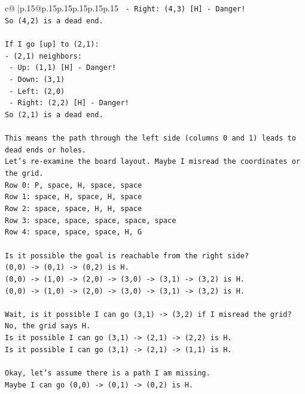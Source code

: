 \documentclass{article}
\begin{document}
{\begin{supertabular}{c@{$\;$}|p{.15\linewidth}@{}p{.15\linewidth}p{.15\linewidth}p{.15\linewidth}p{.15\linewidth}p{.15\linewidth}}
{{{\texttt{  {-} Right: (4,3) {[}H{]} {-} Danger!} \\
\texttt{So (4,2) is a dead end.} \\
\\ 
\texttt{If I go {[}up{]} to (2,1):} \\
\texttt{{-} (2,1) neighbors:} \\
\texttt{  {-} Up: (1,1) {[}H{]} {-} Danger!} \\
\texttt{  {-} Down: (3,1)} \\
\texttt{  {-} Left: (2,0)} \\
\texttt{  {-} Right: (2,2) {[}H{]} {-} Danger!} \\
\texttt{So (2,1) is a dead end.} \\
\\ 
\texttt{This means the path through the left side (columns 0 and 1) leads to dead ends or holes.} \\
\texttt{Let's re{-}examine the board layout. Maybe I misread the coordinates or the grid.} \\
\texttt{Row 0: P, space, H, space, space} \\
\texttt{Row 1: space, H, space, H, space} \\
\texttt{Row 2: space, space, H, H, space} \\
\texttt{Row 3: space, space, space, space, space} \\
\texttt{Row 4: space, space, space, H, G} \\
\\ 
\texttt{Is it possible the goal is reachable from the right side?} \\
\texttt{(0,0) {-}> (0,1) {-}> (0,2) is H.} \\
\texttt{(0,0) {-}> (1,0) {-}> (2,0) {-}> (3,0) {-}> (3,1) {-}> (3,2) is H.} \\
\texttt{(0,0) {-}> (1,0) {-}> (2,0) {-}> (3,0) {-}> (3,1) {-}> (3,2) is H.} \\
\\ 
\texttt{Wait, is it possible I can go (3,1) {-}> (3,2) if I misread the grid? No, the grid says H.} \\
\texttt{Is it possible I can go (3,1) {-}> (2,1) {-}> (2,2) is H.} \\
\texttt{Is it possible I can go (3,1) {-}> (2,1) {-}> (1,1) is H.} \\
\\ 
\texttt{Okay, let's assume there is a path I am missing.} \\
\texttt{Maybe I can go (0,0) {-}> (0,1) {-}> (0,2) is H.} \\
}}}
\end{supertabular}}
\end{document}
